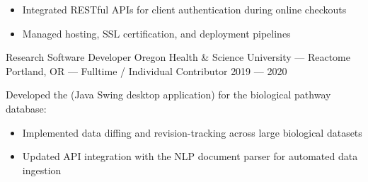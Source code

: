 \begin{itemize}
    \item Integrated RESTful APIs for client authentication during online checkouts
    \item Managed hosting, SSL certification, and deployment pipelines
\end{itemize}

\vspace*{\baselineskip}

\showoff
{Research Software Developer}
{Oregon Health \& Science University --- Reactome}
{Portland, OR --- Fulltime / Individual Contributor}
{2019 --- 2020}

Developed the  (Java Swing desktop application) for the  biological pathway database:

\begin{itemize}
    \item Implemented data diffing and revision-tracking across large biological datasets
    \item Updated API integration with the  NLP document parser for automated data ingestion
\end{itemize}





\vfill \myBreak{}


